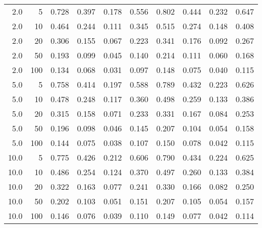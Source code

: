 \begin{table}
\begin{tabular}[t]{rr|rrrr|rrrr}
2.0 & 5 & 0.728 & 0.397 & 0.178 & 0.556 & 0.802 & 0.444 & 0.232 & 0.647\\
2.0 & 10 & 0.464 & 0.244 & 0.111 & 0.345 & 0.515 & 0.274 & 0.148 & 0.408\\
2.0 & 20 & 0.306 & 0.155 & 0.067 & 0.223 & 0.341 & 0.176 & 0.092 & 0.267\\
2.0 & 50 & 0.193 & 0.099 & 0.045 & 0.140 & 0.214 & 0.111 & 0.060 & 0.168\\
2.0 & 100 & 0.134 & 0.068 & 0.031 & 0.097 & 0.148 & 0.075 & 0.040 & 0.115\\

5.0 & 5 & 0.758 & 0.414 & 0.197 & 0.588 & 0.789 & 0.432 & 0.223 & 0.626\\
5.0 & 10 & 0.478 & 0.248 & 0.117 & 0.360 & 0.498 & 0.259 & 0.133 & 0.386\\
5.0 & 20 & 0.315 & 0.158 & 0.071 & 0.233 & 0.331 & 0.167 & 0.084 & 0.253\\
5.0 & 50 & 0.196 & 0.098 & 0.046 & 0.145 & 0.207 & 0.104 & 0.054 & 0.158\\
5.0 & 100 & 0.144 & 0.075 & 0.038 & 0.107 & 0.150 & 0.078 & 0.042 & 0.115\\

10.0 & 5 & 0.775 & 0.426 & 0.212 & 0.606 & 0.790 & 0.434 & 0.224 & 0.625\\
10.0 & 10 & 0.486 & 0.254 & 0.124 & 0.370 & 0.497 & 0.260 & 0.133 & 0.384\\
10.0 & 20 & 0.322 & 0.163 & 0.077 & 0.241 & 0.330 & 0.166 & 0.082 & 0.250\\
10.0 & 50 & 0.202 & 0.103 & 0.051 & 0.151 & 0.207 & 0.105 & 0.054 & 0.157\\
10.0 & 100 & 0.146 & 0.076 & 0.039 & 0.110 & 0.149 & 0.077 & 0.042 & 0.114\\
\bottomrule
\end{tabular}
\end{table}
